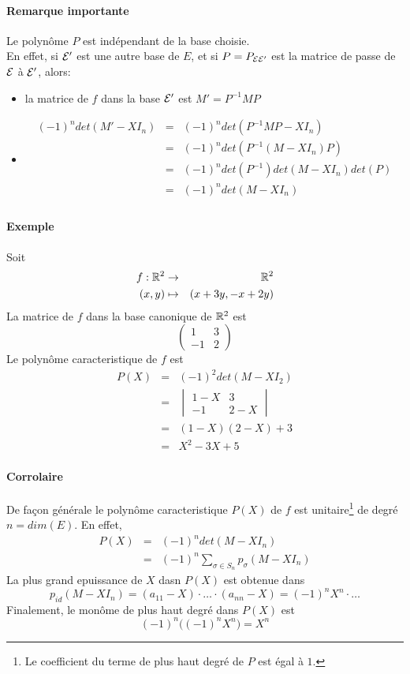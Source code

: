\paragraph{Remarque importante} Le polynôme $P$ est indépendant de la base choisie. \\
En effet, si $\mathcal{E}'$ est une autre base de $E$, et si $P = P_{\mathcal{E} \mathcal{E}'}$ est la matrice de passe de $\mathcal{E}$ à $\mathcal{E}'$, alors:
\begin{itemize}
  \item la matrice de $f$ dans la base $\mathcal{E}'$ est $M' = P^{-1} M P$
  \item 
    \begin{eqnarray*}
      (-1)^{n} det(M' - X I_n) &=& (-1)^{n} det(P^{-1} M P - X I_n) \\
        &=& (-1)^{n} det(P^{-1} (M - X I_n) P) \\
        &=& (-1)^{n} det(P^{-1}) det(M - X I_n) det(P) \\
        &=& (-1)^{n} det(M - X I_n) \\
    \end{eqnarray*}
\end{itemize}

\paragraph{Exemple} Soit 
\begin{eqnarray*}
  f: \mathbb{R}^2 &\rightarrow& \mathbb{R}^2 \\
  (x, y) &\mapsto& (x + 3y, -x + 2y)
\end{eqnarray*}
La matrice de $f$ dans la base canonique de $\mathbb{R}^2$ est 
$$\begin{pmatrix} 1 & 3 \\ -1 & 2 \end{pmatrix}$$
Le polynôme caracteristique de $f$ est
\begin{eqnarray*}
  P(X) &=& (-1)^2 det(M-X I_2) \\
    &=& \begin{vmatrix} 1-X & 3 \\ -1 & 2-X \end{vmatrix} \\
    &=& (1-X)(2-X) + 3 \\
    &=& X^2 -3X + 5 
\end{eqnarray*}

\paragraph{Corrolaire} De façon générale le polynôme caracteristique $P(X)$ de $f$ est unitaire\footnote{Le coefficient du terme de plus haut degré de $P$ est égal à $1$.} de degré $n = dim(E)$. En effet,
\begin{eqnarray*}
  P(X) &=& (-1)^n det(M-X I_n) \\
   &=& (-1)^n \sum_{\sigma \in S_n} p_{\sigma}(M- X I_n)
\end{eqnarray*}
La plus grand epuissance de $X$ dasn $P(X)$ est obtenue dans
$$p_{id}(M - X I_n) = (a_{11} - X) \cdot \ldots \cdot (a_{nn} - X) = (-1)^n X^n \cdot \ldots$$
Finalement, le monôme de plus haut degré dans $P(X)$ est 
$$(-1)^n \big( (-1)^n X^n \big) = X^n$$

